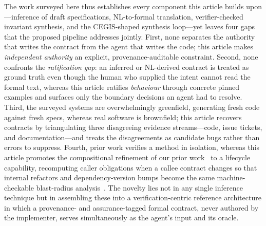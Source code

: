 The work surveyed here thus establishes every component this article builds upon---inference of draft specifications, NL-to-formal translation, verifier-checked invariant synthesis, and the CEGIS-shaped synthesis loop---yet leaves four gaps that the proposed pipeline addresses jointly. First, none separates the authority that writes the contract from the agent that writes the code; this article makes \emph{independent authority} an explicit, provenance-auditable constraint. Second, none confronts the \emph{ratification gap}: an inferred or NL-derived contract is treated as ground truth even though the human who supplied the intent cannot read the formal text, whereas this article ratifies \emph{behaviour} through concrete pinned examples and surfaces only the boundary decisions an agent had to resolve. Third, the surveyed systems are overwhelmingly greenfield, generating fresh code against fresh specs, whereas real software is brownfield; this article recovers contracts by triangulating three disagreeing evidence streams---code, issue tickets, and documentation---and treats the disagreements as candidate bugs rather than errors to suppress. Fourth, prior work verifies a method in isolation, whereas this article promotes the compositional refinement of our prior work~\cite{edmonds_article3} to a lifecycle capability, recomputing caller obligations when a callee contract changes so that internal refactors and dependency-version bumps become the same machine-checkable blast-radius analysis~\cite{edmonds_article4}. The novelty lies not in any single inference technique but in assembling these into a verification-centric reference architecture in which a provenance- and assurance-tagged formal contract, never authored by the implementer, serves simultaneously as the agent's input and its oracle.
